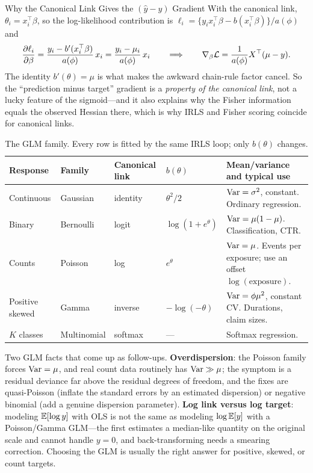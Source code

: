 \begin{mathresult}{Why the Canonical Link Gives the $(\hat{y}-y)$ Gradient}
With the canonical link, $\theta_i = x_i^{\top}\beta$, so the log-likelihood contribution is $\ell_i = \{y_i x_i^{\top}\beta - b(x_i^{\top}\beta)\}/a(\phi)$ and
\begin{equation}
\frac{\partial \ell_i}{\partial \beta} = \frac{y_i - b'(x_i^{\top}\beta)}{a(\phi)}\, x_i = \frac{y_i - \mu_i}{a(\phi)}\,x_i
\qquad\Longrightarrow\qquad
\nabla_\beta \mathcal{L} = \frac{1}{a(\phi)} X^{\top}(\mu - y).
\end{equation}
The identity $b'(\theta) = \mu$ is what makes the awkward chain-rule factor cancel. So the ``prediction minus target'' gradient is a \emph{property of the canonical link}, not a lucky feature of the sigmoid---and it also explains why the Fisher information equals the observed Hessian there, which is why IRLS and Fisher scoring coincide for canonical links.
\end{mathresult}

\begin{table}[H]
\centering\small
\caption{The GLM family. Every row is fitted by the same IRLS loop; only $b(\theta)$ changes.}
\label{cml:tab:glm}
\begin{tabularx}{\textwidth}{@{}l l l l X@{}}
\toprule
\textbf{Response} & \textbf{Family} & \textbf{Canonical link} & \textbf{$b(\theta)$} & \textbf{Mean/variance and typical use} \\
\midrule
Continuous & Gaussian & identity & $\theta^2/2$ & $\operatorname{Var} = \sigma^2$, constant. Ordinary regression. \\
Binary & Bernoulli & logit & $\log(1+e^\theta)$ & $\operatorname{Var}=\mu(1-\mu)$. Classification, CTR. \\
Counts & Poisson & log & $e^\theta$ & $\operatorname{Var}=\mu$. Events per exposure; use an offset $\log(\text{exposure})$. \\
Positive skewed & Gamma & inverse & $-\log(-\theta)$ & $\operatorname{Var}=\phi\mu^2$, constant CV. Durations, claim sizes. \\
$K$ classes & Multinomial & softmax & --- & Softmax regression. \\
\bottomrule
\end{tabularx}
\end{table}

Two GLM facts that come up as follow-ups. \textbf{Overdispersion}: the Poisson family forces $\operatorname{Var} = \mu$, and real count data routinely has $\operatorname{Var} \gg \mu$; the symptom is a residual deviance far above the residual degrees of freedom, and the fixes are quasi-Poisson (inflate the standard errors by an estimated dispersion) or negative binomial (add a genuine dispersion parameter). \textbf{Log link versus log target}: modeling $\operatorname{\mathbb{E}}[\log y]$ with OLS is not the same as modeling $\log \operatorname{\mathbb{E}}[y]$ with a Poisson/Gamma GLM---the first estimates a median-like quantity on the original scale and cannot handle $y=0$, and back-transforming needs a smearing correction. Choosing the GLM is usually the right answer for positive, skewed, or count targets.

